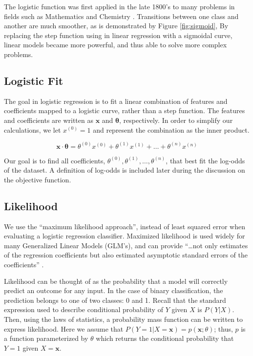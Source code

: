 \documentclass[letterpaper]{article} %
\begin{document}
The logistic function was first applied in the late 1800's
to many problems in fields such as Mathematics and Chemistry
\cite{origins}.
Transitions between one class and another are much smoother,
as is demonstrated by Figure \ref{fig:sigmoid},
By replacing the step function using in linear regression with a sigmoidal curve,
linear models became more powerful, and thus able to solve more complex problems.

\subsection{Logistic Fit}
The goal in logistic regression is to fit a linear combination of features and coefficients
mapped to a logistic curve, rather than a step function.
The features and coefficients are written as
$\mathbf{x}$ and $\mathbf{\theta}$, respectively.
In order to simplify our calculations, we let $x^{(0)} = 1$
and represent the combination as the inner product.

$$\mathbf{x \cdot \theta} = \theta^{(0)}x^{(0)} + \theta^{(1)}x^{(1)} + \dots + \theta^{(n)}x^{(n)}$$

Our goal is to find all coefficients,
$\theta^{(0)},\theta^{(1)},\dots,\theta^{(n)}$,
that best fit the log-odds of the dataset.
A definition of log-odds
is included later during the discussion on the objective function.

\subsection{Likelihood}
We use the ``maximum likelihood approach'',
instead of least squared error when evaluating a logistic regression classifier.
Maximized likelihood is used widely for many Generalized Linear Models (GLM's),
and can provide ``\dots not only estimates of the regression coefficients but also
estimated asymptotic standard errors of the coefficients'' \cite{applied}.

Likelihood can be thought of as the probability that a model will correctly
predict an outcome for any input.
In the case of binary classification, the prediction belongs to one of two classes: 0 and 1.
Recall that the standard expression used to describe conditional probability
of $Y$ given $X$ is $P(Y|X)$.
Then, using the laws of statistics, a
probability mass function can be written to express likelihood.
Here we assume that $P(Y = 1 | X = \mathbf{x}) = p(\mathbf{x};\theta)$;
thus, $p$ is a function parameterized by $\theta$
which returns the conditional probability that $Y = 1$ given $X = \mathbf{x}$.
\end{document}
